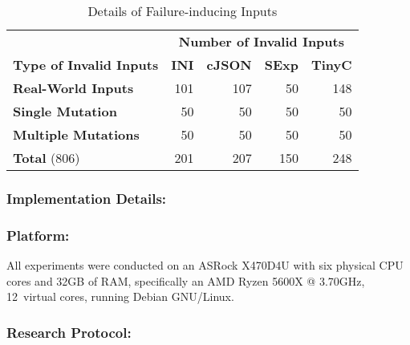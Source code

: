 \documentclass[sigconf,review,anonymous]{acmart}
\newcounter{todocounter}
\newcommand{\todo}[1]{\marginpar{$|$}\textcolor{red}{\stepcounter{todocounter}\footnote[\thetodocounter]{\textcolor{red}{\textbf{TODO }}\textit{#1}}}}
\renewcommand{\todo}[1]{}
\begin{document}
%
%
%
%


\begin{table}[!tbp]\centering
\caption{Details of Failure-inducing Inputs}
\begin{tabular}{|l | r | r | r | r |}
\hline
&  \multicolumn{4}{c|}{\textbf{Number of Invalid Inputs}}  \\
\textbf{Type of Invalid Inputs} & \textbf{INI} & \textbf{cJSON} & \textbf{SExp} & \textbf{TinyC} \\
\hline
\textbf{Real-World Inputs} & 101 & 107 & 50 & 148 \\
\textbf{Single Mutation} & 50 & 50 & 50 & 50 \\
\textbf{Multiple Mutations} & 50 & 50 & 50 & 50 \\
\hline
\textbf{Total } (806) & 201 & 207 & 150 & 248 \\
\hline
\end{tabular}
\label{tab:input-details}
\end{table}
\subsubsection*{\bf Implementation Details:}

\subsubsection*{\bf Platform:} All experiments were conducted
on an ASRock X470D4U with six physical CPU cores %
and 32GB of RAM, specifically an AMD Ryzen 5600X @ 3.70GHz, 12~virtual cores, running Debian GNU/Linux.


\subsubsection*{\bf Research Protocol:}\todo{we should mention the four minute timeout here ... }
\end{document}
